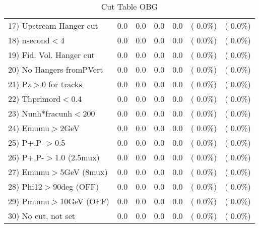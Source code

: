 \begin{table}[h!]
\begin{tabular}{||l||r|r|r|r|r|r||}
 17) Upstream Hanger cut  &          0.0 &          0.0 &          0.0 &          0.0 & (  0.0\%) & (  0.0\%) \\
 18) nsecond$<$4          &          0.0 &          0.0 &          0.0 &          0.0 & (  0.0\%) & (  0.0\%) \\
 19) Fid. Vol. Hanger cut &          0.0 &          0.0 &          0.0 &          0.0 & (  0.0\%) & (  0.0\%) \\
 20) No Hangers fromPVert &          0.0 &          0.0 &          0.0 &          0.0 & (  0.0\%) & (  0.0\%) \\
 21) Pz$>$0 for tracks    &          0.0 &          0.0 &          0.0 &          0.0 & (  0.0\%) & (  0.0\%) \\
 22) Thprimord$<$0.4      &          0.0 &          0.0 &          0.0 &          0.0 & (  0.0\%) & (  0.0\%) \\
 23) Nunh*fracunh$<$200   &          0.0 &          0.0 &          0.0 &          0.0 & (  0.0\%) & (  0.0\%) \\
 24) Emumu$>$2GeV         &          0.0 &          0.0 &          0.0 &          0.0 & (  0.0\%) & (  0.0\%) \\
 25) P+,P-$>$0.5          &          0.0 &          0.0 &          0.0 &          0.0 & (  0.0\%) & (  0.0\%) \\
 26) P+,P-$>$1.0 (2.5mux) &          0.0 &          0.0 &          0.0 &          0.0 & (  0.0\%) & (  0.0\%) \\
 27) Emumu$>$5GeV  (8mux) &          0.0 &          0.0 &          0.0 &          0.0 & (  0.0\%) & (  0.0\%) \\
 28) Phi12$>$90deg  (OFF) &          0.0 &          0.0 &          0.0 &          0.0 & (  0.0\%) & (  0.0\%) \\
 29) Pmumu$>$10GeV  (OFF) &          0.0 &          0.0 &          0.0 &          0.0 & (  0.0\%) & (  0.0\%) \\
 30) No cut, not set      &          0.0 &          0.0 &          0.0 &          0.0 & (  0.0\%) & (  0.0\%) \\
 \hline
 \hline
 \end{tabular}
 \caption{Cut Table  OBG      }
 \label{tab-cutcohjpsi-mumu_qe}
 \end{table}

